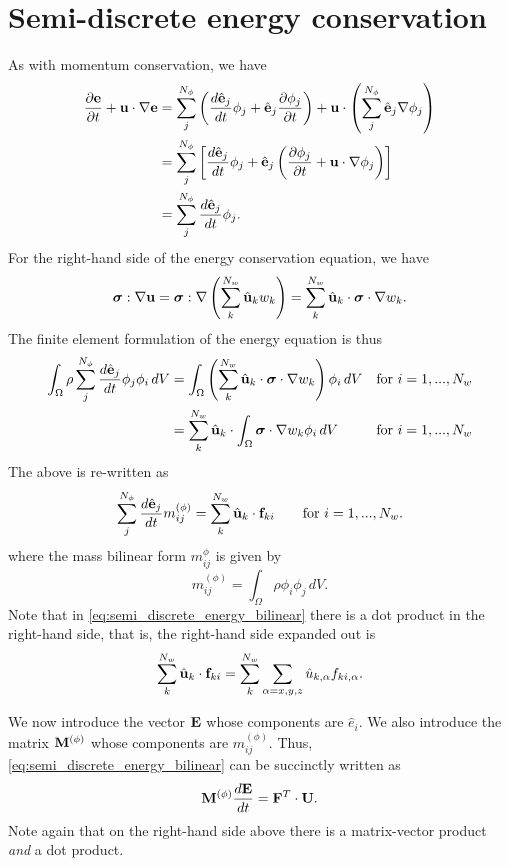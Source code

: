 \documentclass[11pt]{article}
\begin{document}
\section{Semi-discrete energy conservation}
As with momentum conservation, we have
\begin{align}
    \frac{\partial \mathbf{e}}{\partial t} + \mathbf{u} \cdot \nabla \mathbf{e} &= \sum_j^{N_\phi} \left ( \frac{d \hat{\mathbf{e}}_j}{d t} \phi_j + \hat{\mathbf{e}}_j \frac{\partial \phi_j}{\partial t} \right ) + \mathbf{u} \cdot \left ( \sum_j^{N_\phi} \hat{\mathbf{e}}_j \nabla \phi_j \right ) \nonumber \\
    &= \sum_j^{N_\phi} \left [ \frac{d \hat{\mathbf{e}}_j}{d t} \phi_j + \hat{\mathbf{e}}_j \left ( \frac{\partial \phi_j}{\partial t} + \mathbf{u} \cdot \nabla \phi_j \right ) \right ] \nonumber \\
    &= \sum_j^{N_\phi} \frac{d \hat{\mathbf{e}}_j}{d t} \phi_j.
\end{align}
For the right-hand side of the energy conservation equation, we have
\begin{equation}
    \bm \sigma : \nabla \mathbf{u} = \bm \sigma : \nabla \left ( \sum_k^{N_w} \hat{\mathbf{u}}_k w_k \right ) = \sum_k^{N_w} \hat{\mathbf{u}}_k \cdot \bm \sigma \cdot \nabla w_k.
\end{equation}
The finite element formulation of the energy equation is thus 
\begin{align}
    \int_\Omega \rho \sum_j^{N_\phi} \frac{d \hat{\mathbf{e}}_j}{d t} \phi_j \phi_i \, dV &= \int_\Omega \left ( \sum_k^{N_w} \hat{\mathbf{u}}_k \cdot \bm \sigma \cdot \nabla w_k \right ) \phi_i \, dV &\text{for } i = 1,...,N_w \nonumber \\
    &=\sum_k^{N_w} \hat{\mathbf{u}}_k \cdot \int_\Omega \bm \sigma \cdot \nabla w_k \phi_i \, dV &\text{for } i = 1,...,N_w
\end{align}
The above is re-written as
\begin{equation}
    \label{eq:semi_discrete_energy_bilinear}
    \sum_j^{N_\phi} \frac{d \hat{\mathbf{e}}_j}{d t} m^{(\phi)}_{ij} = \sum_k^{N_w} \hat{\mathbf{u}}_k \cdot \mathbf{f}_{ki} \qquad \text{for } i = 1,...,N_w.
\end{equation}
where the mass bilinear form $m^{\phi}_{ij}$ is given by 
\begin{equation}
    m^{(\phi)}_{ij} = \int_\Omega \rho \phi_i \phi_j \, dV.
\end{equation}
Note that in \cref{eq:semi_discrete_energy_bilinear} there is a dot product in the right-hand side, that is, the right-hand side expanded out is  
\begin{equation}
    \sum_k^{N_w} \hat{\mathbf{u}}_k \cdot \mathbf{f}_{ki} = \sum_k^{N_w} \sum_{\alpha=x,y,z} \hat{u}_{k,\alpha} f_{ki,\alpha}.
\end{equation}

We now introduce the vector $\mathbf{E}$ whose components are $\hat{e}_i$. We also introduce the matrix $\mathbf{M}^{(\phi)}$ whose components are $m_{ij}^{(\phi)}$. Thus, \cref{eq:semi_discrete_energy_bilinear} can be succinctly written as
\begin{equation}
    \mathbf{M}^{(\phi)} \frac{d\mathbf{E}}{dt} = \mathbf{F}^T \cdot \mathbf{U}.
\end{equation}
Note again that on the right-hand side above there is a matrix-vector product \textit{and} a dot product.
\end{document}
